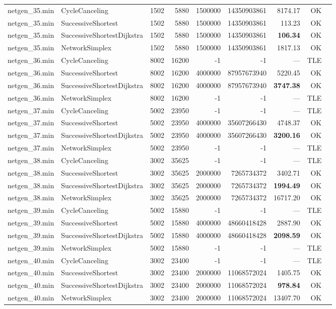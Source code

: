 \begin{longtable}{llrrrrrrl}
\midrule
netgen\_35.min & CycleCanceling & 1502 & 5880 & 1500000 & 14350903861 & 8174.17 & OK \\
netgen\_35.min & SuccessiveShortest & 1502 & 5880 & 1500000 & 14350903861 & 113.23 & OK \\
netgen\_35.min & SuccessiveShortestDijkstra & 1502 & 5880 & 1500000 & 14350903861 & \textbf{106.34} & OK \\
netgen\_35.min & NetworkSimplex & 1502 & 5880 & 1500000 & 14350903861 & 1817.13 & OK \\
\midrule
netgen\_36.min & CycleCanceling & 8002 & 16200 & -1 & -1 & --- & TLE \\
netgen\_36.min & SuccessiveShortest & 8002 & 16200 & 4000000 & 87957673940 & 5220.45 & OK \\
netgen\_36.min & SuccessiveShortestDijkstra & 8002 & 16200 & 4000000 & 87957673940 & \textbf{3747.38} & OK \\
netgen\_36.min & NetworkSimplex & 8002 & 16200 & -1 & -1 & --- & TLE \\
\midrule
netgen\_37.min & CycleCanceling & 5002 & 23950 & -1 & -1 & --- & TLE \\
netgen\_37.min & SuccessiveShortest & 5002 & 23950 & 4000000 & 35607266430 & 4748.37 & OK \\
netgen\_37.min & SuccessiveShortestDijkstra & 5002 & 23950 & 4000000 & 35607266430 & \textbf{3200.16} & OK \\
netgen\_37.min & NetworkSimplex & 5002 & 23950 & -1 & -1 & --- & TLE \\
\midrule
netgen\_38.min & CycleCanceling & 3002 & 35625 & -1 & -1 & --- & TLE \\
netgen\_38.min & SuccessiveShortest & 3002 & 35625 & 2000000 & 7265734372 & 3402.71 & OK \\
netgen\_38.min & SuccessiveShortestDijkstra & 3002 & 35625 & 2000000 & 7265734372 & \textbf{1994.49} & OK \\
netgen\_38.min & NetworkSimplex & 3002 & 35625 & 2000000 & 7265734372 & 16717.20 & OK \\
\midrule
netgen\_39.min & CycleCanceling & 5002 & 15880 & -1 & -1 & --- & TLE \\
netgen\_39.min & SuccessiveShortest & 5002 & 15880 & 4000000 & 48660418428 & 2887.90 & OK \\
netgen\_39.min & SuccessiveShortestDijkstra & 5002 & 15880 & 4000000 & 48660418428 & \textbf{2098.59} & OK \\
netgen\_39.min & NetworkSimplex & 5002 & 15880 & -1 & -1 & --- & TLE \\
\midrule
netgen\_40.min & CycleCanceling & 3002 & 23400 & -1 & -1 & --- & TLE \\
netgen\_40.min & SuccessiveShortest & 3002 & 23400 & 2000000 & 11068572024 & 1405.75 & OK \\
netgen\_40.min & SuccessiveShortestDijkstra & 3002 & 23400 & 2000000 & 11068572024 & \textbf{978.84} & OK \\
netgen\_40.min & NetworkSimplex & 3002 & 23400 & 2000000 & 11068572024 & 13407.70 & OK \\
\end{longtable}
\endgroup
